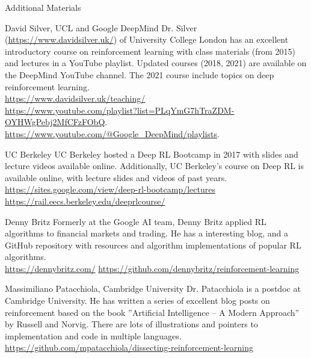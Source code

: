 \documentclass[ignorenonframetext,xcolor=x11names]{beamer}
\begin{document}
\begin{frame}[allowframebreaks]{Additional Materials}
\footnotesize
\begin{block}{David Silver, UCL and Google DeepMind}
Dr. Silver (\url{https://www.davidsilver.uk/}) of University College London has an excellent introductory course on reinforcement learning with class materials (from 2015) and lectures in a YouTube playlist. Updated courses (2018, 2021) are available on the DeepMind YouTube channel. The 2021 course include topics on deep reinforcement learning. \\
\vspace{\baselineskip}
\url{https://www.davidsilver.uk/teaching/} \\
\vspace{.5\baselineskip}
\url{https://www.youtube.com/playlist?list=PLqYmG7hTraZDM-OYHWgPebj2MfCFzFObQ}. \\
\vspace{.5\baselineskip}
\url{https://www.youtube.com/@Google_DeepMind/playlists}.
\end{block}

\begin{block}{UC Berkeley}
UC Berkeley hosted a Deep RL Bootcamp in 2017 with slides and lecture videos available online. Additionally, UC Berkeley's course on Deep RL is available online, with lecture slides and videos of past years.
\vspace{\baselineskip}
\url{https://sites.google.com/view/deep-rl-bootcamp/lectures}
\vspace{\baselineskip}
\url{https://rail.eecs.berkeley.edu/deeprlcourse/}
\end{block}

\begin{block}{Denny Britz}
Formerly at the Google AI team, Denny Britz applied RL algorithms to financial markets and trading. He has a interesting blog, and a GitHub repository with resources and algorithm implementations of popular RL algorithms. \\
\vspace{\baselineskip}
\url{https://dennybritz.com/}
\vspace{\baselineskip}
\url{https://github.com/dennybritz/reinforcement-learning}
\end{block}

\begin{block}{Massimiliano Patacchiola, Cambridge University} 
Dr. Patacchiola is a postdoc at Cambridge University. He has written a series of excellent blog posts on reinforcement based on the book ''Artificial Intelligence -- A Modern Approach'' by Russell and Norvig. There are lots of illustrations and pointers to implementation and code in multiple languages. \\
\vspace{\baselineskip}
\url{https://github.com/mpatacchiola/dissecting-reinforcement-learning}
\end{block}


\end{frame}
\end{document}
